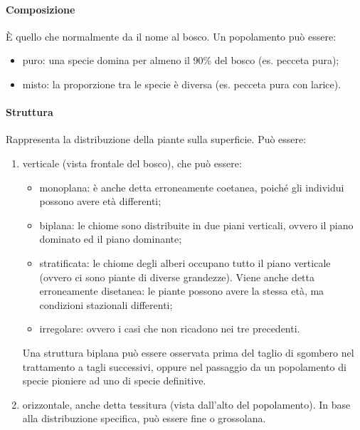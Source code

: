 \paragraph{Composizione}
È quello che normalmente da il nome al bosco. Un popolamento può essere:
\begin{itemize}[nosep]
    \item puro: una specie domina per almeno il 90\% del bosco (es. pecceta pura);
    \item misto: la proporzione tra le specie è diversa (es. pecceta pura con larice).
\end{itemize}
\paragraph{Struttura}
Rappresenta la distribuzione della piante sulla superficie. Può essere:
\begin{enumerate}[nosep]
    \item verticale (vista frontale del bosco), che può essere:
    \begin{itemize}[nosep]
        \item monoplana: è anche detta erroneamente coetanea, poiché gli individui possono avere età differenti;
        \item biplana: le chiome sono distribuite in due piani verticali, ovvero il piano dominato ed il piano dominante;
        \item stratificata: le chiome degli alberi occupano tutto il piano verticale (ovvero ci sono piante di diverse grandezze). Viene anche detta erroneamente disetanea: le piante possono avere la stessa età, ma condizioni stazionali differenti;
        \item irregolare: ovvero i casi che non ricadono nei tre precedenti.
    \end{itemize}
    Una struttura biplana può essere osservata prima del taglio di sgombero nel trattamento a tagli successivi, oppure nel passaggio da un popolamento di specie pioniere ad uno di specie definitive.
    \item orizzontale, anche detta tessitura (vista dall'alto del popolamento). In base alla distribuzione specifica, può essere fine o grossolana.
\end{enumerate}
